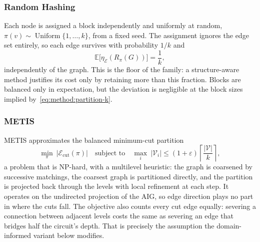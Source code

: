 \subsubsection{Random Hashing}
\label{sec:method:partition:random}
Each node is assigned a block independently and uniformly at random,
$\pi(v) \sim \operatorname{Uniform}\{1, \dots, k\}$, from a fixed seed. The assignment
ignores the edge set entirely, so each edge survives with probability $1/k$ and
\begin{equation}
    \mathbb{E}\bigl[ \eta_{\mathcal{E}}(R_\pi(G)) \bigr] = \frac{1}{k},
    \label{eq:method:partition-random}
\end{equation}
independently of the graph. This is the floor of the family: a structure-aware method
justifies its cost only by retaining more than this fraction. Blocks are balanced only in
expectation, but the deviation is negligible at the block sizes implied
by~\eqref{eq:method:partition-k}.

\subsubsection{METIS}
\label{sec:method:partition:metis}
METIS \citep{karypis1997metis} approximates the balanced minimum-cut partition
\begin{equation}
    \min_{\pi}\ \bigl| \mathcal{E}_{\mathrm{cut}}(\pi) \bigr|
    \quad \text{subject to} \quad
    \max_{i}\ |\mathcal{V}_i|
    \leq (1 + \varepsilon) \left\lceil \frac{|\mathcal{V}|}{k} \right\rceil,
    \label{eq:method:partition-metis}
\end{equation}
a problem that is NP-hard, with a multilevel heuristic: the graph is coarsened by
successive matchings, the coarsest graph is partitioned directly, and the partition is
projected back through the levels with local refinement at each step. It operates on the
undirected projection of the AIG, so edge direction plays no part in where the cuts fall.
The objective also counts every cut edge equally: severing a connection between adjacent
levels costs the same as severing an edge that bridges half the circuit's depth. That is
precisely the assumption the domain-informed variant below modifies.

